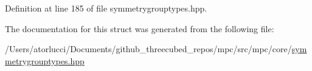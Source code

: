 Definition at line 185 of file symmetrygrouptypes.\+hpp.



The documentation for this struct was generated from the following file\+:\begin{DoxyCompactItemize}
\item 
/\+Users/atorlucci/\+Documents/github\+\_\+threecubed\+\_\+repos/mpc/src/mpc/core/\mbox{\hyperlink{symmetrygrouptypes_8hpp}{symmetrygrouptypes.\+hpp}}\end{DoxyCompactItemize}
